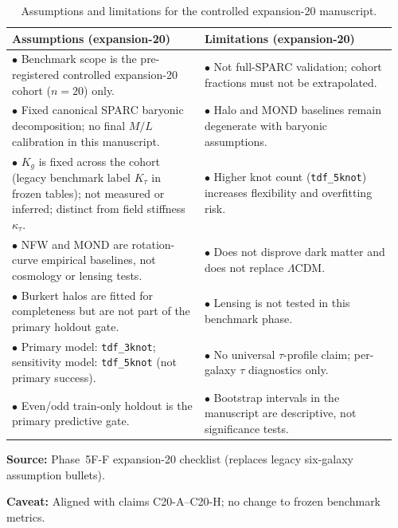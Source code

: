 \begin{table}[htbp]
\centering
\caption{Assumptions and limitations for the controlled expansion-20 manuscript.}
\label{tab:assumptions}
\footnotesize
\begin{tabular}{@{}p{0.48\linewidth}p{0.48\linewidth}@{}}
\toprule
\textbf{Assumptions (expansion-20)} & \textbf{Limitations (expansion-20)} \\
\midrule
$\bullet$ Benchmark scope is the pre-registered controlled expansion-20 cohort ($n{=}20$) only. & $\bullet$ Not full-SPARC validation; cohort fractions must not be extrapolated. \\
$\bullet$ Fixed canonical SPARC baryonic decomposition; no final $M/L$ calibration in this manuscript. & $\bullet$ Halo and MOND baselines remain degenerate with baryonic assumptions. \\
$\bullet$ $K_g$ is fixed across the cohort (legacy benchmark label $K_\tau$ in frozen tables); not measured or inferred; distinct from field stiffness $\kappa_\tau$. & $\bullet$ Higher knot count (\texttt{tdf\_5knot}) increases flexibility and overfitting risk. \\
$\bullet$ NFW and MOND are rotation-curve empirical baselines, not cosmology or lensing tests. & $\bullet$ Does not disprove dark matter and does not replace $\Lambda$CDM. \\
$\bullet$ Burkert halos are fitted for completeness but are not part of the primary holdout gate. & $\bullet$ Lensing is not tested in this benchmark phase. \\
$\bullet$ Primary model: \texttt{tdf\_3knot}; sensitivity model: \texttt{tdf\_5knot} (not primary success). & $\bullet$ No universal $\tau$-profile claim; per-galaxy $\tau$ diagnostics only. \\
$\bullet$ Even/odd train-only holdout is the primary predictive gate. & $\bullet$ Bootstrap intervals in the manuscript are descriptive, not significance tests. \\
\bottomrule
\end{tabular}
\vspace{0.4em}
{\footnotesize
\par\noindent\textbf{Source:} Phase~5F-F expansion-20 checklist (replaces legacy six-galaxy assumption bullets).
\par\noindent\textbf{Caveat:} Aligned with claims C20-A--C20-H; no change to frozen benchmark metrics.
\par
}
\end{table}
